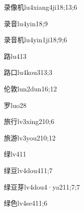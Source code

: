 \begin{verbete}{录像机}{lu4xiang4ji1}{8;13;6}
\end{verbete}
\begin{verbete}{录音}{lu4yin1}{8;9}
\end{verbete}
\begin{verbete}{录音机}{lu4yin1ji1}{8;9;6}
\end{verbete}
\begin{verbete}{路}{lu4}{13}
\end{verbete}
\begin{verbete}[13;3]{路口}{lu4kou3}{13;3}
\end{verbete}
\begin{verbete}{伦敦}{lun2dun1}{6;12}
\end{verbete}
\begin{verbete}{罗}{luo2}{8}
\end{verbete}
\begin{verbete}{旅行}{lv3xing2}{10;6}
\end{verbete}
\begin{verbete}{旅游}{lv3you2}{10;12}
\end{verbete}
\begin{verbete}{绿}{lv4}{11}
\end{verbete}
\begin{verbete}{绿豆}{lv4dou4}{11;7}
\end{verbete}
\begin{verbete}{绿豆芽}{lv4dou4·ya2}{11;7;7}
\end{verbete}
\begin{verbete}{绿色}{lv4se4}{11;6}
\end{verbete}

